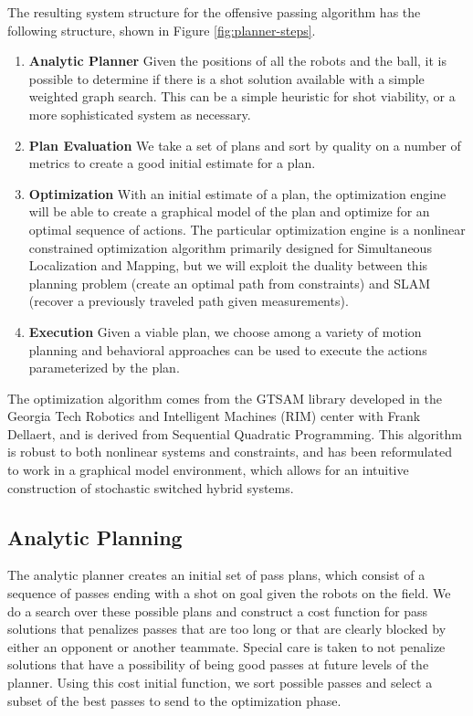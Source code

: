 The resulting system structure for the offensive passing algorithm has the following structure, shown in Figure \ref{fig:planner-steps}.
\begin{enumerate}
 \item \textbf{Analytic Planner} Given the positions of all the robots and the ball, it is possible to determine if there is a shot solution available with a simple weighted graph search. This can be a simple heuristic for shot viability, or a more sophisticated system as necessary.
 \item \textbf{Plan Evaluation} We take a set of plans and sort by quality on a number of metrics to create a good initial estimate for a plan.
 \item \textbf{Optimization} With an initial estimate of a plan, the optimization engine will be able to create a graphical model of the plan and optimize for an optimal sequence of actions. The particular optimization engine is a nonlinear constrained optimization algorithm primarily designed for Simultaneous Localization and Mapping, but we will exploit the duality between this planning problem (create an optimal path from constraints) and SLAM (recover a previously traveled path given measurements).
 \item \textbf{Execution} Given a viable plan, we choose among a variety of motion planning and behavioral approaches can be used to execute the actions parameterized by the plan.  
\end{enumerate}

The optimization algorithm comes from the GTSAM library \cite{Dellaert05rss} developed in the Georgia Tech Robotics and Intelligent Machines (RIM) center with Frank Dellaert, and is derived from Sequential Quadratic Programming. This algorithm is robust to both nonlinear systems and constraints, and has been reformulated to work in a graphical model environment, which allows for an intuitive construction of stochastic switched hybrid systems.

\subsection{Analytic Planning}
The analytic planner creates an initial set of pass plans, which consist of a sequence of passes ending with a shot on goal given the robots on the field.  We do a search over these possible plans and construct a cost function for pass solutions that penalizes passes that are too long or that are clearly blocked by either an opponent or another teammate. Special care is taken to not penalize solutions that have a possibility of being good passes at future levels of the planner. Using this cost initial function, we sort possible passes and select a subset of the best passes to send to the optimization phase.

